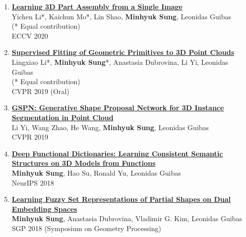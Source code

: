 \documentclass[letterpaper,10pt]{article} %
\newcommand{\blankline}{\quad\pagebreak[2]}
\begin{document}
{\begin{enumerate}
\item \label{eccv20_1}
\href{https://cs.stanford.edu/~kaichun/impartass/}{\textbf{Learning 3D Part Assembly from a Single Image}}\\
Yichen Li*, Kaichun Mo*, Lin Shao, \textbf{Minhyuk Sung}, Leonidas Guibas\\
(* Equal contribution)\\
ECCV 2020\\
\blankline

\item \label{cvpr19_2}
\href{https://arxiv.org/abs/1811.08988}{\textbf{Supervised Fitting of Geometric Primitives to 3D Point Clouds}}\\
Lingxiao Li*, \textbf{Minhyuk Sung}*, Anastasia Dubrovina, Li Yi, Leonidas Guibas\\
(* Equal contribution)\\
CVPR 2019 (Oral)\\
\blankline

\item \label{cvpr19_1}
\href{https://arxiv.org/abs/1812.03320}{\textbf{GSPN: Generative Shape Proposal Network for 3D Instance Segmentation in Point Cloud}}\\
Li Yi, Wang Zhao, He Wang, \textbf{Minhyuk Sung}, Leonidas Guibas\\
CVPR 2019\\
\blankline

\item \label{neurips18}
\href{https://arxiv.org/abs/1805.09957}{\textbf{Deep Functional Dictionaries: Learning Consistent Semantic Structures on 3D Models from Functions}}\\
\textbf{Minhyuk Sung}, Hao Su, Ronald Yu, Leonidas Guibas\\
NeurIPS 2018\\
\blankline

\item \label{sgp18}
\href{https://mhsung.github.io/fuzzy-set-dual}{\textbf{Learning Fuzzy Set Representations of Partial Shapes on Dual Embedding Spaces}}\\
\textbf{Minhyuk Sung}, Anastasia Dubrovina, Vladimir G. Kim, Leonidas Guibas\\
SGP 2018 (Symposium on Geometry Processing)\\
\blankline


\end{enumerate}}
\end{document}
